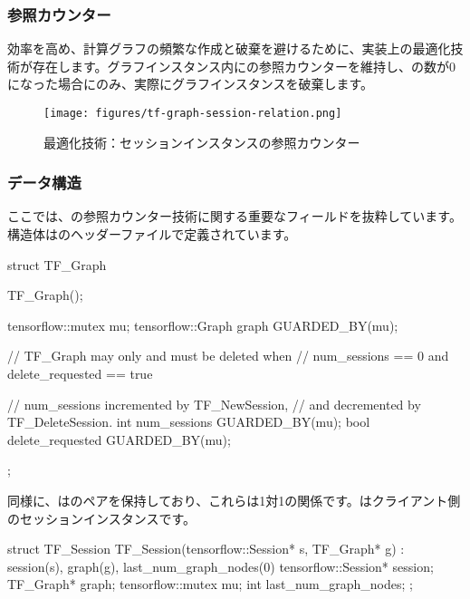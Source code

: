 \begin{content}
\subsubsection{参照カウンター}

効率を高め、計算グラフの頻繁な作成と破棄を避けるために、実装上の最適化技術が存在します。グラフインスタンス内にの参照カウンターを維持し、の数が0になった場合にのみ、実際にグラフインスタンスを破棄します。

\begin{figure}[!htbp]
\centering
\texttt{[image: figures/tf-graph-session-relation.png]}
\caption{最適化技術：セッションインスタンスの参照カウンター}
 \label{fig:tf-graph-session-relation}
\end{figure}

\subsubsection{データ構造}

ここでは、の参照カウンター技術に関する重要なフィールドを抜粋しています。構造体はのヘッダーファイルで定義されています。

\begin{leftbar}
\begin{c++}
struct TF_Graph {
  TF_Graph();

  tensorflow::mutex mu;
  tensorflow::Graph graph GUARDED_BY(mu);

  // TF\_Graph may only and must be deleted when
  // num\_sessions == 0 and delete\_requested == true

  // num\_sessions incremented by TF\_NewSession, 
  // and decremented by TF\_DeleteSession.
  int num_sessions GUARDED_BY(mu);
  bool delete_requested GUARDED_BY(mu);
};
\end{c++}
\end{leftbar}

同様に、はのペアを保持しており、これらは1対1の関係です。はクライアント側のセッションインスタンスです。

\begin{leftbar}
\begin{c++}
struct TF_Session {
  TF_Session(tensorflow::Session* s, TF_Graph* g)
      : session(s), graph(g), last_num_graph_nodes(0) {}
  tensorflow::Session* session;
  TF_Graph* graph;
  tensorflow::mutex mu;
  int last_num_graph_nodes;
};
\end{c++}
\end{leftbar}


\end{content}
